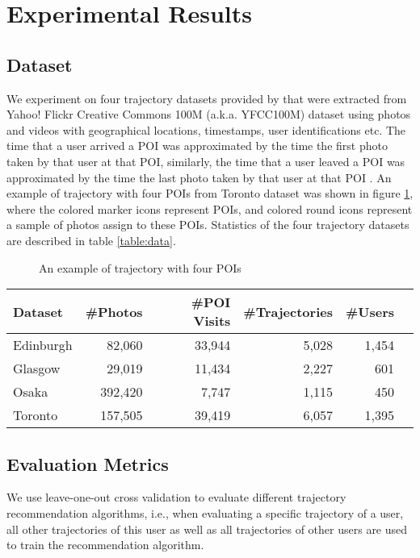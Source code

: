 \section{Experimental Results}
\label{experiment}

\subsection{Dataset}
\label{experiment:dataset}
We experiment on four trajectory datasets provided by \cite{ijcai15} that were
extracted from Yahoo! Flickr Creative Commons 100M (a.k.a. YFCC100M) dataset\cite{yfcc100m} 
using photos and videos with geographical locations, timestamps, user identifications etc.
The time that a user arrived a POI was approximated by the time the first photo taken by that user at that POI,
similarly, the time that a user leaved a POI was approximated by the time the last photo taken by that user at 
that POI \cite{ijcai15}.
An example of trajectory with four POIs from Toronto dataset was shown in figure \ref{fig:traj}, 
where the colored marker icons represent POIs, 
and colored round icons represent a sample of photos assign to these POIs.
Statistics of the four trajectory datasets are described in table \ref{table:data}.


\begin{figure}
\centering
{}
\caption{An example of trajectory with four POIs}
\label{fig:traj}
\end{figure}

\begin{table*}
\centering
\begin{tabular}{lrrrrr} \hline
\textbf{Dataset} & \textbf{\#Photos} & \textbf{\#POI Visits} & \textbf{\#Trajectories} & \textbf{\#Users} \\ \hline
Edinburgh & 82,060 & 33,944 & 5,028 & 1,454 \\ 
Glasgow & 29,019 & 11,434 & 2,227 & 601 \\ 
Osaka & 392,420 & 7,747 & 1,115 & 450 \\ 
Toronto & 157,505 & 39,419 & 6,057 & 1,395 \\ 
\hline
\end{tabular}
\caption{Statistics of trajectory dataset}
\label{table:data}
\end{table*}


\subsection{Evaluation Metrics}
\label{experiment:metric}
We use leave-one-out cross validation to evaluate different trajectory recommendation algorithms,
i.e., when evaluating a specific trajectory of a user, all other trajectories of this user as well as 
all trajectories of other users are used to train the recommendation algorithm.

